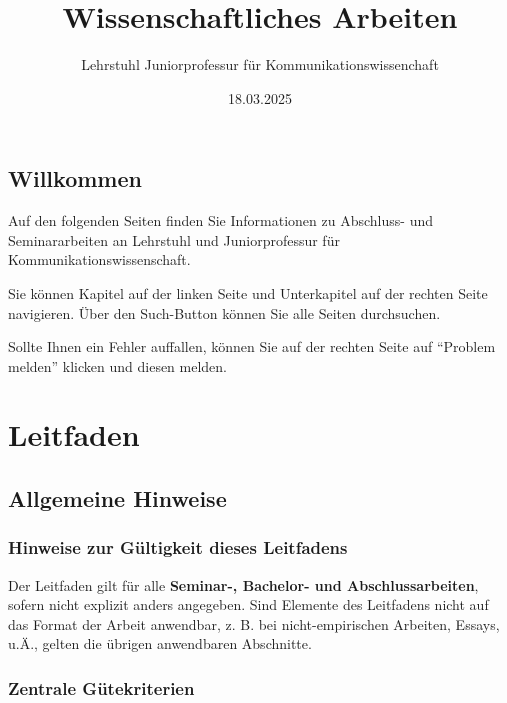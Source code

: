 \documentclass[
  letterpaper,
  DIV=11]{scrreprt}
\title{Wissenschaftliches Arbeiten}
\author{Lehrstuhl \textbar{} Juniorprofessur für
Kommunikationswissenchaft}
\date{18.03.2025}
\renewcommand*\contentsname{Inhaltsverzeichnis}
\newcommand\contentsname{Inhaltsverzeichnis}
\begin{document}
\maketitle

\renewcommand*\contentsname{Inhaltsverzeichnis}
{
\hypersetup{linkcolor=}
\setcounter{tocdepth}{2}
\tableofcontents
}

\chapter*{Willkommen}\label{willkommen}


Auf den folgenden Seiten finden Sie Informationen zu Abschluss- und
Seminararbeiten an Lehrstuhl und Juniorprofessur für
Kommunikationswissenschaft.

Sie können Kapitel auf der linken Seite und Unterkapitel auf der rechten
Seite navigieren. Über den Such-Button können Sie alle Seiten
durchsuchen.

Sollte Ihnen ein Fehler auffallen, können Sie auf der rechten Seite auf
``Problem melden'' klicken und diesen melden.

\part{Leitfaden}

\chapter{Allgemeine Hinweise}\label{allgemeine-hinweise}

\section{Hinweise zur Gültigkeit dieses
Leitfadens}\label{hinweise-zur-guxfcltigkeit-dieses-leitfadens}

Der Leitfaden gilt für alle \textbf{Seminar-, Bachelor- und
Abschlussarbeiten}, sofern nicht explizit anders angegeben. Sind
Elemente des Leitfadens nicht auf das Format der Arbeit anwendbar, z. B.
bei nicht-empirischen Arbeiten, Essays, u.Ä., gelten die übrigen
anwendbaren Abschnitte.

\section{Zentrale Gütekriterien}\label{zentrale-guxfctekriterien}
\end{document}
